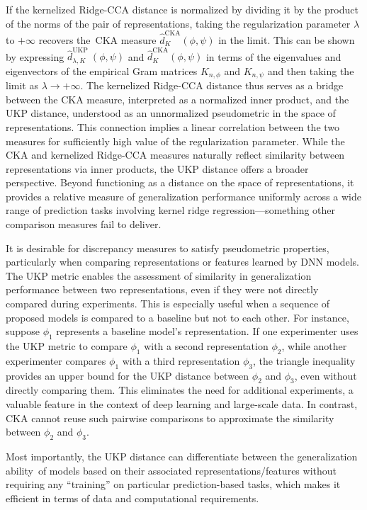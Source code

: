 \documentclass[11pt]{article}
\newcommand{\repone}{\phi}
\newcommand{\reptwo}{\psi}
\newcommand{\metricstname}{UKP }
\theoremstyle{plain}
\begin{document}
If the kernelized Ridge-CCA distance is normalized by dividing it by the product of the norms of the pair of representations, taking the regularization parameter $\lambda$ to $+\infty$ recovers the CKA measure $\hat{d}_{K}^{\text{CKA}}(\repone,\reptwo)$ in the limit. This can be shown by expressing $\hat{d}_{\lambda,K}^{\text{\metricstname}}(\repone,\reptwo)$ and $\hat{d}_{K}^{\text{CKA}}(\repone,\reptwo)$ in terms of the eigenvalues and eigenvectors of the empirical Gram matrices $K_{n,\repone}$ and $K_{n,\reptwo}$ and then taking the limit as $\lambda \to +\infty$. The kernelized Ridge-CCA distance thus serves as a bridge between the CKA measure, interpreted as a normalized inner product, and the \metricstname distance, understood as an unnormalized pseudometric in the space of representations. This connection implies a linear correlation between the two measures for sufficiently high value of the regularization parameter. While the CKA and kernelized Ridge-CCA measures naturally reflect similarity between representations via inner products, the \metricstname distance offers a broader perspective. Beyond functioning as a distance on the space of representations, it provides a relative measure of generalization performance uniformly across a wide range of prediction tasks involving kernel ridge regression—something other comparison measures fail to deliver.

It is desirable for discrepancy measures to satisfy pseudometric properties, particularly when comparing representations or features learned by DNN models. The UKP metric enables the assessment of similarity in generalization performance between two representations, even if they were not directly compared during experiments. This is especially useful when a sequence of proposed models is compared to a baseline but not to each other. For instance, suppose $\phi_{1}$ represents a baseline model's representation. If one experimenter uses the UKP metric to compare $\phi_{1}$ with a second representation $\phi_{2}$, while another experimenter compares 
$\phi_{1}$ with a third representation $\phi_{3}$, the triangle inequality provides an upper bound for the UKP distance between $\phi_{2}$ and $\phi_{3}$, even without directly comparing them. This eliminates the need for additional experiments, a valuable feature in the context of deep learning and large-scale data. In contrast, CKA cannot reuse such pairwise comparisons to approximate the similarity between $\phi_{2}$ and $\phi_{3}$. 

Most importantly, the \metricstname distance can differentiate between the generalization ability of models based on their associated representations/features without requiring any ``training'' on particular prediction-based tasks, which makes it efficient in terms of data and computational requirements.
\end{document}
